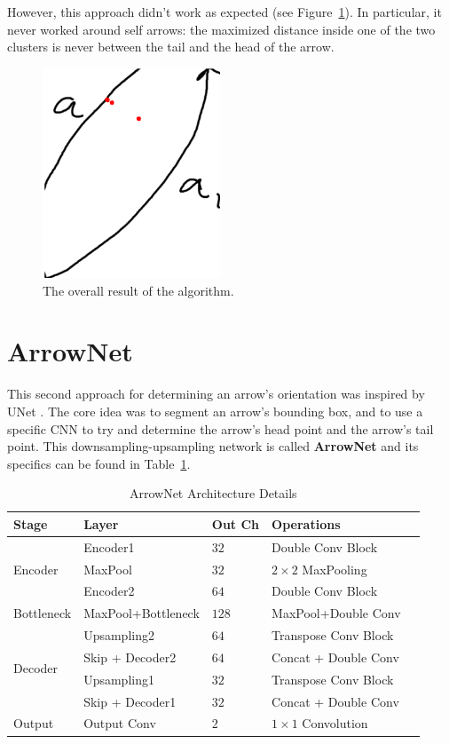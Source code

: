 \documentclass[conference]{IEEEtran}
\begin{document}
\begin{appendices}
However, this approach didn't work as expected (see Figure~\ref{fig:template_matching_fail}). In particular, it never worked around self arrows: the maximized distance inside one of the two clusters is never between the tail and the head of the arrow.

\begin{figure}[H]
	\centering
	\includegraphics[width=150pt]{template_matching_fail.png}
	\caption{The overall result of the algorithm.}
	\label{fig:template_matching_fail}
\end{figure}

\section{ArrowNet}
\label{arrow-net}
This second approach for determining an arrow's orientation was inspired by UNet \cite{unet}. The core idea was to segment an arrow's bounding box, and to use a specific CNN to try and determine the arrow's head point and the arrow's tail point. This downsampling-upsampling network is called \textbf{ArrowNet} and its specifics can be found in Table~\ref{table:arrownet}.

\begin{table}[htbp]
	\centering
	\caption{ArrowNet Architecture Details}
	\label{tab:arrownet}
	\begin{tabular}{|l|l|l|l|l|}
		\hline
		\textbf{Stage} & \textbf{Layer} & \textbf{Out Ch} & \textbf{Operations} \\
		\hline
		\multirow{3}{*}{Encoder} 
		& Encoder1 & $32$ & Double Conv Block \\
		& MaxPool & $32$ & $2 \times 2$ MaxPooling \\
		& Encoder2 & $64$ & Double Conv Block \\
		\hline
		Bottleneck 
		& MaxPool+Bottleneck & $128$ & MaxPool+Double Conv \\
		\hline
		\multirow{4}{*}{Decoder}
		& Upsampling2 & $64$ & Transpose Conv Block \\
		& Skip + Decoder2 & $64$ & Concat + Double Conv \\
		& Upsampling1 & $32$ & Transpose Conv Block \\
		& Skip + Decoder1 & $32$ & Concat + Double Conv \\
		\hline
		Output & Output Conv & $2$ & $1 \times 1$ Convolution \\
		\hline
	\end{tabular}
	\label{table:arrownet}
\end{table}


\end{appendices}
\end{document}
